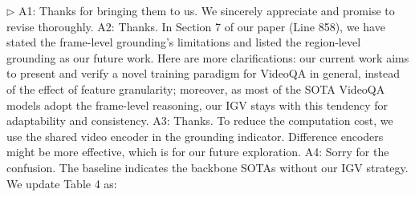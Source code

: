 \documentclass[10pt,twocolumn,letterpaper]{article}
\newcommand{\blue}[1]{{\color{blue}{#1}}}
\newcommand{\pink}[1]{{\color{magenta}{#1}}}
\begin{document}
\vspace{9pt}
\noindent
$\triangleright$\pink{Reviewer \#6.}
\blue{Q1: Typos.}
A1: Thanks for bringing them to us. We sincerely appreciate and promise to revise thoroughly.
\blue{Q2: Frame- \& Region-level Grounding.}
A2: Thanks. In Section 7 of our paper (\cf Line 858), we have stated the frame-level grounding's limitations and listed the region-level grounding as our future work.
Here are more clarifications: our current work aims to present and verify a novel training paradigm for VideoQA in general, instead of the effect of feature granularity; moreover, as most of the SOTA VideoQA models adopt the frame-level reasoning, our IGV stays with this tendency for adaptability and consistency.
\blue{Q3: Shared video encoder with grounding indicator.}
A3: Thanks. To reduce the computation cost, we use the shared video encoder in the grounding indicator. Difference encoders might be more effective, which is for our future exploration.
\blue{Q4: Baseline method in Table 4.}
A4: Sorry for the confusion. The baseline indicates the backbone SOTAs without our IGV strategy. We update Table 4 as: 
\vspace{-15pt}
%  
\begin{table}[ht]
\small
  \centering
  \caption{Study of IGV loss components}
   \vspace{-10pt}
  \label{tab:ablation-loss}%
  \vspace{-15pt}
\end{table}%
\end{document}
